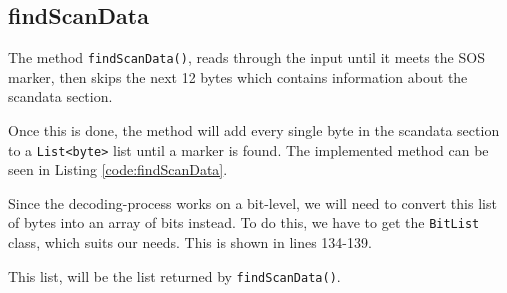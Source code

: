 \subsection{findScanData}
The method \lstinline|findScanData()|, reads through the input until it meets the SOS marker, then skips the next 12 bytes which contains information about the scandata section.

Once this is done, the method will add every single byte in the scandata section to a \lstinline|List<byte>| list until a marker is found. The implemented method can be seen in Listing \ref{code:findScanData}.

Since the decoding-process works on a bit-level, we will need to convert this list of bytes into an array of bits instead. To do this, we have to get the \lstinline|BitList| class, which suits our needs. This is shown in lines 134-139.

This list, will be the list returned by \lstinline|findScanData()|.
